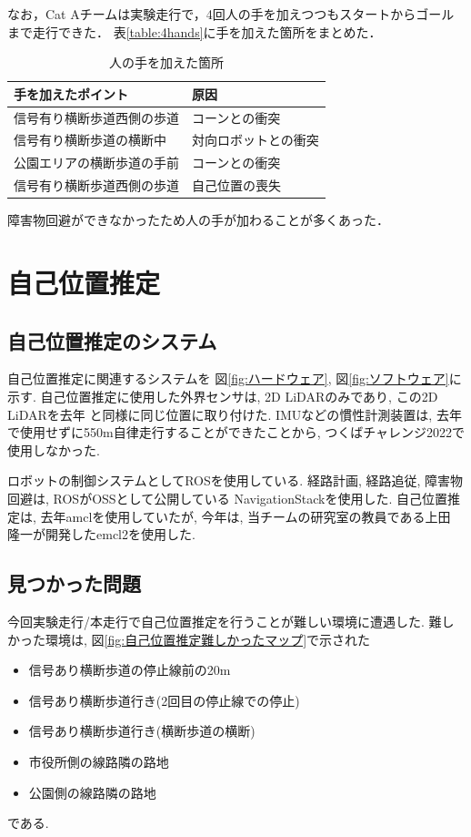 \documentclass[twocolumn,9pt]{jsproceedings}
\begin{document}
なお，Cat Aチームは実験走行で，4回人の手を加えつつもスタートからゴールまで走行できた．
表\ref{table:4hands}に手を加えた箇所をまとめた．

\begin{table}[h]
  \label{4hands}
  \begin{tabular}{|l|l|}
    \hline
    手を加えたポイント & 原因 \\
    \hline
    信号有り横断歩道西側の歩道 & コーンとの衝突 \\
    \hline
    信号有り横断歩道の横断中 & 対向ロボットとの衝突 \\ 
    \hline
    公園エリアの横断歩道の手前 & コーンとの衝突 \\ 
    \hline
    信号有り横断歩道西側の歩道 & 自己位置の喪失 \\ 
    \hline
  \end{tabular}
  \caption{人の手を加えた箇所}
\end{table}

障害物回避ができなかったため人の手が加わることが多くあった．

\section{自己位置推定}

\subsection{自己位置推定のシステム}

自己位置推定に関連するシステムを
図\ref{fig:ハードウェア}, 図\ref{fig:ソフトウェア}に示す. 
自己位置推定に使用した外界センサは, 2D LiDARのみであり,
この2D LiDARを去年\cite{去年のつくばチャレンジシンポジウム}
と同様に同じ位置に取り付けた.
IMUなどの慣性計測装置は, 去年で使用せずに550m自律走行することができたことから, 
つくばチャレンジ2022で使用しなかった. 

ロボットの制御システムとしてROSを使用している. 
経路計画, 経路追従, 障害物回避は, ROSがOSSとして公開している
NavigationStackを使用した. 
自己位置推定は, 去年amclを使用していたが, 
今年は, 当チームの研究室の教員である上田 隆一が開発したemcl2を使用した. 

\subsection{見つかった問題}

今回実験走行/本走行で自己位置推定を行うことが難しい環境に遭遇した. 
難しかった環境は, 図\ref{fig:自己位置推定難しかったマップ}で示された
\begin{itemize}
  \item 信号あり横断歩道の停止線前の20m
  \item 信号あり横断歩道行き(2回目の停止線での停止)
  \item 信号あり横断歩道行き(横断歩道の横断)
  \item 市役所側の線路隣の路地
  \item 公園側の線路隣の路地
\end{itemize}
である. 
\end{document}
